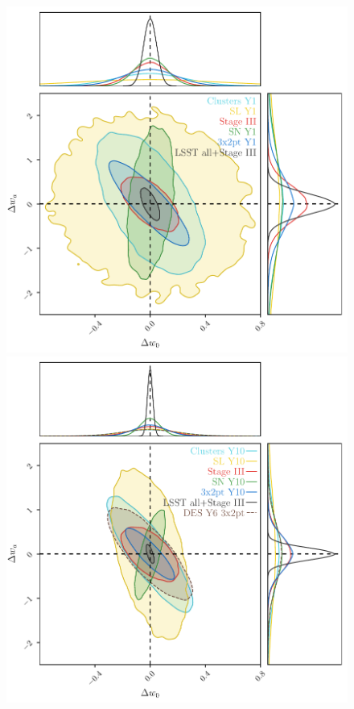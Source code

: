 \begin{figure}
  \begin{center}
    \includegraphics[width=0.999\linewidth]{LSST_Y1_Aug13}
    \includegraphics[width=0.999\linewidth]{DESC_SRD_DES_LSST_Y10}

\end{center}
\end{figure}
